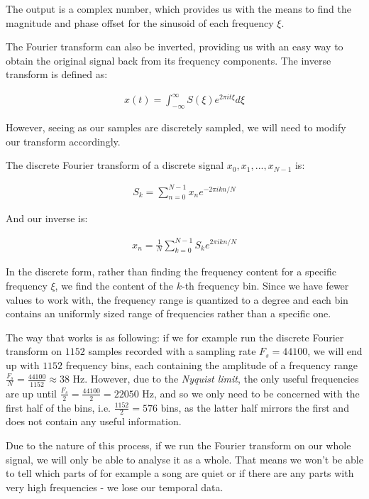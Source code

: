 The output is a complex number, which provides us with the means to find the magnitude and phase offset for the sinusoid of each frequency $\xi$.

The Fourier transform can also be inverted, providing us with an easy way to obtain the original signal back from its frequency components. The inverse transform is defined as:

\begin{align}
x(t) = \int_{-\infty}^{\infty}S(\xi)e^{2\pi it\xi}d\xi
\end{align}

However, seeing as our samples are discretely sampled, we will need to modify our transform accordingly.

The discrete Fourier transform of a discrete signal $x_0, x_1, ..., x_{N-1}$ is: \cite{Recoskie2014ConstrainedNM}

\begin{align}
S_k = \sum_{n=0}^{N-1}x_ne^{-2\pi ikn/N}
\end{align}

And our inverse is:

\begin{align}
x_n = \frac1N \sum_{k=0}^{N-1}S_ke^{2\pi ikn/N}
\end{align}

In the discrete form, rather than finding the frequency content for a specific frequency $\xi$, we find the content of the $k$-th frequency bin. Since we have fewer values to work with, the frequency range is quantized to a degree and each bin contains an uniformly sized range of frequencies rather than a specific one.

The way that works is as following: if we for example run the discrete Fourier transform on $1152$ samples recorded with a sampling rate $F_s = 44100$, we will end up with $1152$ frequency bins, each containing the amplitude of a frequency range $\frac{F_s}{N} = \frac{44100}{1152} \approx 38$ Hz. However, due to the \emph{Nyquist limit}, the only useful frequencies are up until $\frac{F_s}{2} = \frac{44100}{2} = 22050$ Hz, and so we only need to be concerned with the first half of the bins, i.e. $\frac{1152}{2} = 576$ bins, as the latter half mirrors the first and does not contain any useful information.

Due to the nature of this process, if we run the Fourier transform on our whole signal, we will only be able to analyse it as a whole. That means we won't be able to tell which parts of for example a song are quiet or if there are any parts with very high frequencies - we lose our temporal data.

